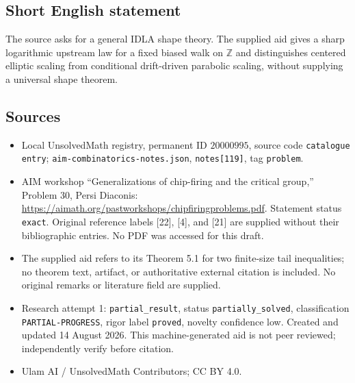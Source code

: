 \documentclass[11pt]{article}
\newcommand{\Z}{\mathbb{Z}}
\begin{document}
\subsection{Short English statement}
The source asks for a general IDLA shape theory. The supplied aid gives a sharp logarithmic upstream law for a fixed biased walk on \(\Z\) and distinguishes centered elliptic scaling from conditional drift-driven parabolic scaling, without supplying a universal shape theorem.
\subsection{Sources}
\begin{itemize}
\item Local UnsolvedMath registry, permanent ID \(20000995\), source code \texttt{catalogue entry}; \texttt{aim-combinatorics-notes.json}, \texttt{notes[119]}, tag \texttt{problem}.
\item AIM workshop ``Generalizations of chip-firing and the critical group,'' Problem 30, Persi Diaconis: \url{https://aimath.org/pastworkshops/chipfiringproblems.pdf}. Statement status \texttt{exact}. Original reference labels [22], [4], and [21] are supplied without their bibliographic entries. No PDF was accessed for this draft.
\item The supplied aid refers to its Theorem 5.1 for two finite-size tail inequalities; no theorem text, artifact, or authoritative external citation is included. No original remarks or literature field are supplied.
\item Research attempt 1: \texttt{partial\_result}, status \texttt{partially\_solved}, classification \texttt{PARTIAL-PROGRESS}, rigor label \texttt{proved}, novelty confidence low. Created and updated 14 August 2026. This machine-generated aid is not peer reviewed; independently verify before citation.
\item Ulam AI / UnsolvedMath Contributors; CC BY 4.0.
\end{itemize}
\end{document}
